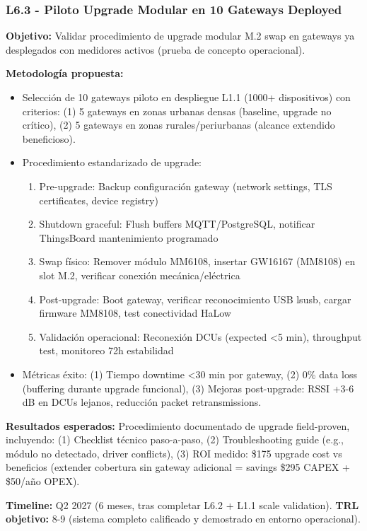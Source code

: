 \subsubsection{L6.3 - Piloto Upgrade Modular en 10 Gateways Deployed}

\textbf{Objetivo:} Validar procedimiento de upgrade modular M.2 swap en gateways ya desplegados con medidores activos (prueba de concepto operacional).

\textbf{Metodología propuesta:}
\begin{itemize}
    \item Selección de 10 gateways piloto en despliegue L1.1 (1000+ dispositivos) con criterios: (1) 5 gateways en zonas urbanas densas (baseline, upgrade no crítico), (2) 5 gateways en zonas rurales/periurbanas (alcance extendido beneficioso).
    \item Procedimiento estandarizado de upgrade:
    \begin{enumerate}
        \item Pre-upgrade: Backup configuración gateway (network settings, TLS certificates, device registry)
        \item Shutdown graceful: Flush buffers MQTT/PostgreSQL, notificar ThingsBoard mantenimiento programado
        \item Swap físico: Remover módulo MM6108, insertar GW16167 (MM8108) en slot M.2, verificar conexión mecánica/eléctrica
        \item Post-upgrade: Boot gateway, verificar reconocimiento USB lsusb, cargar firmware MM8108, test conectividad HaLow
        \item Validación operacional: Reconexión DCUs (expected <5 min), throughput test, monitoreo 72h estabilidad
    \end{enumerate}
    \item Métricas éxito: (1) Tiempo downtime <30 min por gateway, (2) 0\% data loss (buffering durante upgrade funcional), (3) Mejoras post-upgrade: RSSI +3-6 dB en DCUs lejanos, reducción packet retransmissions.
\end{itemize}

\textbf{Resultados esperados:} Procedimiento documentado de upgrade field-proven, incluyendo: (1) Checklist técnico paso-a-paso, (2) Troubleshooting guide (e.g., módulo no detectado, driver conflicts), (3) ROI medido: \$175 upgrade cost vs beneficios (extender cobertura sin gateway adicional = savings \$295 CAPEX + \$50/año OPEX).

\textbf{Timeline:} Q2 2027 (6 meses, tras completar L6.2 + L1.1 scale validation). \textbf{TRL objetivo:} 8-9 (sistema completo calificado y demostrado en entorno operacional).

